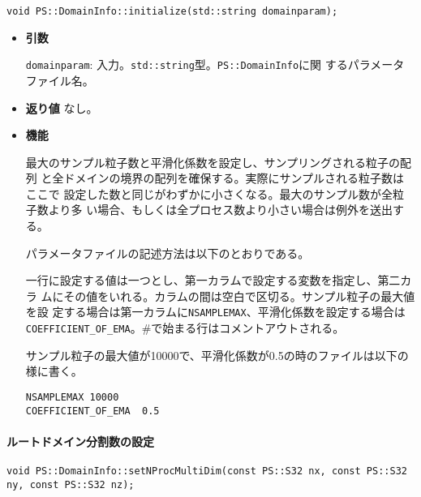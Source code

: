 \begin{screen}
\begin{verbatim}
void PS::DomainInfo::initialize(std::string domainparam);
\end{verbatim}
\end{screen}

\begin{itemize}

\item{{\bf 引数}}

{\tt domainparam}: 入力。{\tt std::string}型。{\tt PS::DomainInfo}に関
するパラメータファイル名。

\item{{\bf 返り値}}
なし。

\item{{\bf 機能}}

最大のサンプル粒子数と平滑化係数を設定し、サンプリングされる粒子の配列
と全ドメインの境界の配列を確保する。実際にサンプルされる粒子数はここで
設定した数と同じがわずかに小さくなる。最大のサンプル数が全粒子数より多
い場合、もしくは全プロセス数より小さい場合は例外を送出する。

パラメータファイルの記述方法は以下のとおりである。

一行に設定する値は一つとし、第一カラムで設定する変数を指定し、第二カラ
ムにその値をいれる。カラムの間は空白で区切る。サンプル粒子の最大値を設
定する場合は第一カラムに{\tt NSAMPLEMAX}、平滑化係数を設定する場合は
{\tt COEFFICIENT\_OF\_EMA}。\#で始まる行はコメントアウトされる。

サンプル粒子の最大値が10000で、平滑化係数が0.5の時のファイルは以下の様に書く。
\begin{lstlisting}
NSAMPLEMAX 10000
COEFFICIENT_OF_EMA  0.5
\end{lstlisting}

\end{itemize}

\paragraph{ルートドメイン分割数の設定}
\mbox{}

\begin{screen}
\begin{verbatim}
void PS::DomainInfo::setNProcMultiDim(const PS::S32 nx, const PS::S32 ny, const PS::S32 nz);
\end{verbatim}
\end{screen}


